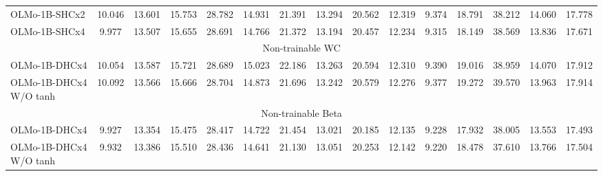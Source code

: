 \begin{table}[h]
{\begin{minipage}{\textheight}
\begin{tabular}{lcccccccccccccr}
\midrule
OLMo-1B-SHCx2 & 10.046 & 13.601 & 15.753 & 28.782 & 14.931 & 21.391 & 13.294 & 20.562 & 12.319 & 9.374 & 18.791 & 38.212 & 14.060 & 17.778 \\
OLMo-1B-SHCx4 & 9.977 & 13.507 & 15.655 & 28.691 & 14.766 & 21.372 & 13.194 & 20.457 & 12.234 & 9.315 & 18.149 & 38.569 & 13.836 & 17.671 \\
\midrule
\multicolumn{15}{c}{\cellcolor{gray!20} Non-trainable WC} \\
\midrule
OLMo-1B-DHCx4 & 10.054 & 13.587 & 15.721 & 28.689 & 15.023 & 22.186 & 13.263 & 20.594 & 12.310 & 9.390 & 19.016 & 38.959 & 14.070 & 17.912 \\
OLMo-1B-DHCx4 W/O tanh & 10.092 & 13.566 & 15.666 & 28.704 & 14.873 & 21.696 & 13.242 & 20.579 & 12.276 & 9.377 & 19.272 & 39.570 & 13.963 & 17.914 \\
\midrule
\multicolumn{15}{c}{\cellcolor{gray!20} Non-trainable Beta} \\
\midrule
OLMo-1B-DHCx4 & 9.927 & 13.354 & 15.475 & 28.417 & 14.722 & 21.454 & 13.021 & 20.185 & 12.135 & 9.228 & 17.932 & 38.005 & 13.553 & 17.493 \\
OLMo-1B-DHCx4 W/O tanh & 9.932 & 13.386 & 15.510 & 28.436 & 14.641 & 21.130 & 13.051 & 20.253 & 12.142 & 9.220 & 18.478 & 37.610 & 13.766 & 17.504 \\
\bottomrule
\end{tabular}
\label{tab:v2_validation_set_perplexity}
\end{minipage}
}
\end{table}


